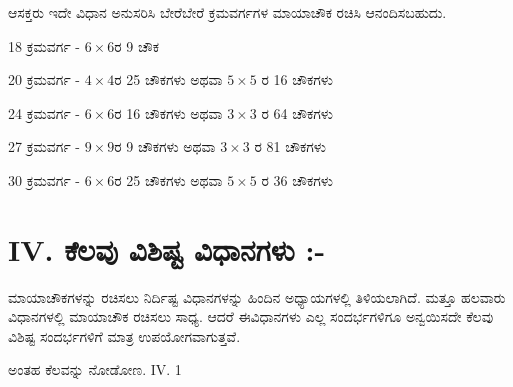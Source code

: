 \begin{itemize}
	ಆಸಕ್ತರು ಇದೇ ವಿಧಾನ ಅನುಸರಿಸಿ ಬೇರೆಬೇರೆ ಕ್ರಮವರ್ಗಗಳ ಮಾಯಾಚೌಕ ರಚಿಸಿ ಆನಂದಿಸಬಹುದು.

	18 ಕ್ರಮವರ್ಗ - $6 \times 6$ರ 9 ಚೌಕ

	20 ಕ್ರಮವರ್ಗ - $4 \times 4$ರ 25 ಚೌಕಗಳು ಅಥವಾ $5 \times 5$ ರ 16 ಚೌಕಗಳು

	24 ಕ್ರಮವರ್ಗ - $6 \times 6$ರ 16 ಚೌಕಗಳು ಅಥವಾ $3 \times 3$ ರ 64 ಚೌಕಗಳು

	27 ಕ್ರಮವರ್ಗ - $9 \times 9$ರ 9 ಚೌಕಗಳು ಅಥವಾ $3 \times 3$ ರ 81 ಚೌಕಗಳು

	30 ಕ್ರಮವರ್ಗ - $6 \times 6$ರ 25 ಚೌಕಗಳು ಅಥವಾ $5 \times 5$ ರ 36 ಚೌಕಗಳು
\end{itemize}

\section*{IV. ಕೆಲವು ವಿಶಿಷ್ಟ ವಿಧಾನಗಳು :-}

ಮಾಯಾಚೌಕಗಳನ್ನು ರಚಿಸಲು ನಿರ್ದಿಷ್ಟ ವಿಧಾನಗಳನ್ನು ಹಿಂದಿನ ಅಧ್ಯಾಯಗಳಲ್ಲಿ ತಿಳಿಯಲಾಗಿದೆ. ಮತ್ತೂ ಹಲವಾರು ವಿಧಾನಗಳಲ್ಲಿ ಮಾಯಾಚೌಕ ರಚಿಸಲು ಸಾಧ್ಯ. ಆದರೆ ಈ\break ವಿಧಾನಗಳು ಎಲ್ಲ ಸಂದರ್ಭಗಳಿಗೂ ಅನ್ವಯಿಸದೇ ಕೆಲವು ವಿಶಿಷ್ಟ ಸಂದರ್ಭಗಳಿಗೆ ಮಾತ್ರ ಉಪಯೋಗವಾಗುತ್ತವೆ.

ಅಂತಹ ಕೆಲವನ್ನು ನೋಡೋಣ. IV. 1

